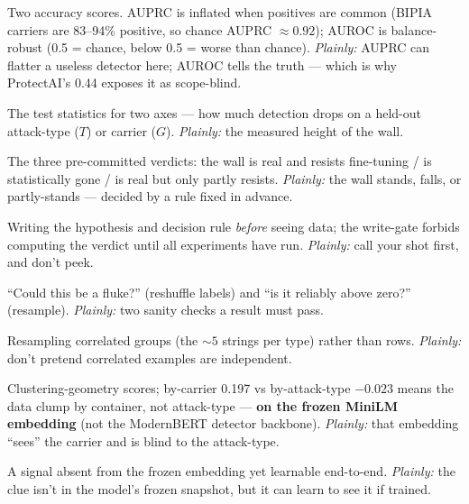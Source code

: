 \documentclass[11pt,parskip=half-]{scrartcl}
\begin{document}
\begin{description}[leftmargin=0pt,style=unboxed,itemsep=3pt]
\item[]  Two accuracy scores. AUPRC is inflated when positives are common (BIPIA
  carriers are 83--94\% positive, so chance AUPRC ${\approx}0.92$); AUROC is balance-robust (0.5 =
  chance, below 0.5 = worse than chance). \emph{Plainly:} AUPRC can flatter a useless detector here;
  AUROC tells the truth --- which is why ProtectAI's 0.44 exposes it as scope-blind.

\item[]  The test statistics for two axes --- how much detection
  drops on a held-out attack-type ($T$) or carrier ($G$). \emph{Plainly:} the measured height of the
  wall.

\item[]  The three pre-committed verdicts: the wall is
  real and resists fine-tuning / is statistically gone / is real but only partly resists. \emph{Plainly:}
  the wall stands, falls, or partly-stands --- decided by a rule fixed in advance.

\item[]  Writing the hypothesis and decision rule \emph{before}
  seeing data; the write-gate forbids computing the verdict until all experiments have run.
  \emph{Plainly:} call your shot first, and don't peek.

\item[]  ``Could this be a fluke?'' (reshuffle labels) and ``is it
  reliably above zero?'' (resample). \emph{Plainly:} two sanity checks a result must pass.

\item[]  Resampling correlated groups (the ${\sim}5$ strings per
  type) rather than rows. \emph{Plainly:} don't pretend correlated examples are independent.

\item[]  Clustering-geometry scores; by-carrier 0.197 vs by-attack-type
  $-0.023$ means the data clump by container, not attack-type --- \textbf{on the frozen MiniLM
  embedding} (not the ModernBERT detector backbone). \emph{Plainly:} that embedding ``sees'' the carrier
  and is blind to the attack-type.

\item[]  A signal absent from the frozen embedding yet learnable end-to-end.
  \emph{Plainly:} the clue isn't in the model's frozen snapshot, but it can learn to see it if trained.


\end{description}
\end{document}

